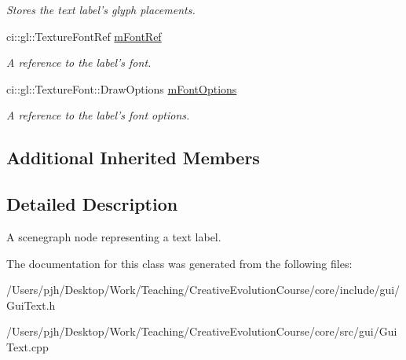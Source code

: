 \begin{DoxyCompactItemize}
\begin{DoxyCompactList}\small\item\em Stores the text label's glyph placements. \end{DoxyCompactList}\item 
\hypertarget{class_ui_text_a2b1afaaaca6d4b69db11a55b430a86c6}{ci\-::gl\-::\-Texture\-Font\-Ref \hyperlink{class_ui_text_a2b1afaaaca6d4b69db11a55b430a86c6}{m\-Font\-Ref}}\label{class_ui_text_a2b1afaaaca6d4b69db11a55b430a86c6}

\begin{DoxyCompactList}\small\item\em A reference to the label's font. \end{DoxyCompactList}\item 
\hypertarget{class_ui_text_a0c6486cc561df0242f3c4b458f0f2ef8}{ci\-::gl\-::\-Texture\-Font\-::\-Draw\-Options \hyperlink{class_ui_text_a0c6486cc561df0242f3c4b458f0f2ef8}{m\-Font\-Options}}\label{class_ui_text_a0c6486cc561df0242f3c4b458f0f2ef8}

\begin{DoxyCompactList}\small\item\em A reference to the label's font options. \end{DoxyCompactList}\end{DoxyCompactItemize}
\subsection*{Additional Inherited Members}


\subsection{Detailed Description}
A scenegraph node representing a text label. 

The documentation for this class was generated from the following files\-:\begin{DoxyCompactItemize}
\item 
/\-Users/pjh/\-Desktop/\-Work/\-Teaching/\-Creative\-Evolution\-Course/core/include/gui/Gui\-Text.\-h\item 
/\-Users/pjh/\-Desktop/\-Work/\-Teaching/\-Creative\-Evolution\-Course/core/src/gui/Gui\-Text.\-cpp\end{DoxyCompactItemize}
